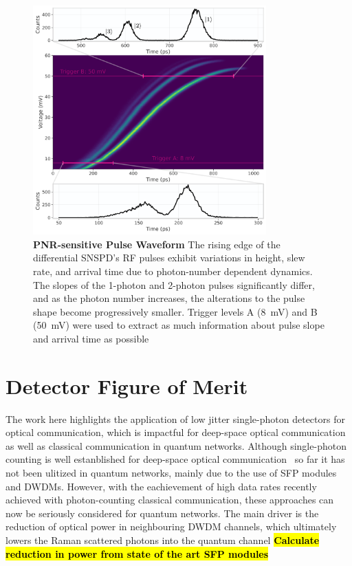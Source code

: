 \documentclass[11pt]{caltech_thesis} %
\begin{document}
\hypertarget{fig:waveform}{%
\begin{figure}
\centering
\includegraphics[width=0.8\textwidth,height=\textheight]{./chapter_04/figs/waveform_light.pdf}
\caption[{PNR-sensitive Pulse Waveform}]{\textbf{PNR-sensitive Pulse Waveform} The rising edge of the differential SNSPD's RF pulses exhibit variations in height, slew rate, and arrival time due to photon-number dependent dynamics. The slopes of the 1-photon and 2-photon pulses significantly differ, and as the photon number increases, the alterations to the pulse shape become progressively smaller. Trigger levels A (8~mV) and B (50~mV) were used to extract as much information about pulse slope and arrival time as possible}
\label{fig:waveform}
\end{figure}
}

\hypertarget{detector-figure-of-merit}{%
\section{Detector Figure of Merit}\label{detector-figure-of-merit}}

The work here highlights the application of low jitter single-photon detectors for optical communication, which is impactful for deep-space optical communication as well as classical communication in quantum networks. Although single-photon counting is well estanblished for deep-space optical communication~\autocite{Srinivasan2023GroundReceiver} so far it has not been ulitized in quantum networks, mainly due to the use of SFP modules and DWDMs. However, with the eachievement of high data rates recently achieved with photon-counting classical communication, these approaches can now be seriously considered for quantum networks. The main driver is the reduction of optical power in neighbouring DWDM channels, which ultimately lowers the Raman scattered photons into the quantum channel \autocite{EraerdsRaman}
\textbf{\hl{Calculate reduction in power from state of the art SFP modules}}
\end{document}
